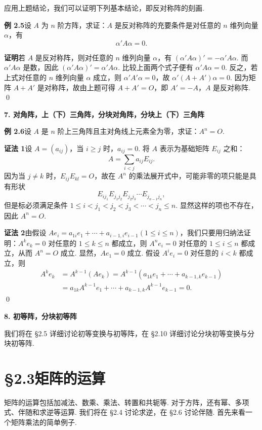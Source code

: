 \documentclass[UTF8, 12pt, fontset=fandol, oneside]{ctexart}
\begin{document}
应用上题结论，我们可以证明下列基本结论，即反对称阵的刻画.

\noindent\textbf{例 2.5}\quad 设 $A$ 为 $n$ 阶方阵，求证：$A$ 是反对称阵的充要条件是对任意的 $n$ 维列向量 $\alpha$，有
\[
\alpha' A\alpha=0.
\]

\noindent\textbf{证明}\quad 若 $A$ 是反对称阵，则对任意的 $n$ 维列向量 $\alpha$，有 $(\alpha'A\alpha)'=-\alpha'A\alpha$. 而 $\alpha'A\alpha$ 是数，因此 $(\alpha'A\alpha)'=\alpha'A\alpha$. 比较上面两个式子便有 $\alpha'A\alpha=0$. 反之，若
上式对任意的 $n$ 维列向量 $\alpha$ 成立，则 $\alpha'A'\alpha=0$，故 $\alpha'(A+A')\alpha=0$. 因为矩阵 $A+A'$ 是对称阵，故由上题可得 $A+A'=O$，即 $A'=-A$，$A$ 是反对称阵. \qed

\noindent\textbf{7. 对角阵，上（下）三角阵，分块对角阵，分块上（下）三角阵}

\noindent\textbf{例 2.6}\quad 设 $A$ 是 $n$ 阶上三角阵且主对角线上元素全为零，求证：$A^n=O$.

\noindent\textbf{证法 1}\quad 设 $A=(a_{ij})$，当 $i\ge j$ 时，$a_{ij}=0$. 将 $A$ 表示为基础矩阵 $E_{ij}$ 之和：
\[
A=\sum_{i<j}a_{ij}E_{ij}.
\]
因为当 $j\ne k$ 时，$E_{ij}E_{kl}=O$，故在 $A^n$ 的乘法展开式中，可能非零的项只能是具有形状
\[
E_{ij_1}E_{j_1j_2}E_{j_2j_3}\cdots E_{j_{n-1}j_n},
\]
但是标必须满足条件 $1\le i<j_1<j_2<j_3<\cdots<j_n\le n$. 显然这样的项也不存在，因此 $A^n=O$.

\noindent\textbf{证法 2}\quad 由假设 $Ae_i=a_{1i}e_1+\cdots+a_{i-1,i}e_{i-1}(1\le i\le n)$，我们只要用归纳法证明：$A^ke_k=0$ 对任意的 $1\le k\le n$ 都成立，则 $A^ne_i=0$ 对任意的 $1\le i\le n$ 都成立，从而 $A^n=O$ 成立. 显然，$Ae_1=0$ 成立. 假设 $A^ie_i=0$ 对任意的 $i<k$ 都成立，则
\[
\begin{aligned}
A^ke_k
&=A^{k-1}(Ae_k)=A^{k-1}(a_{1k}e_1+\cdots+a_{k-1,k}e_{k-1})\\
&=a_{1k}A^{k-1}e_1+\cdots+a_{k-1,k}A^{k-1}e_{k-1}=0.
\end{aligned}
\]
\qed

\noindent\textbf{8. 初等阵，分块初等阵}

我们将在 §2.5 详细讨论初等变换与初等阵，在 §2.10 详细讨论分块初等变换与分块初等阵.

\section*{§2.3\quad 矩阵的运算}

矩阵的运算包括加减法、数乘、乘法、转置和共轭等. 对于方阵，还有幂、多项式、伴随和求逆等运算. 我们将在 §2.4 讨论求逆，在 §2.6 讨论伴随. 首先来看一个矩阵乘法的简单例子.
\end{document}
